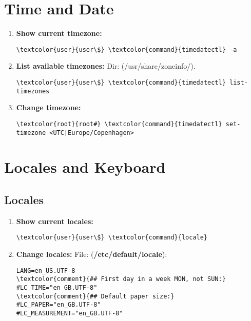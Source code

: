 \documentclass[10pt, a4paper, onecolumn, openany]{book} %
\begin{document}
\section{Time and Date}
\begin{enumerate}
    \item \textbf{Show current timezone:}
\begin{Verbatim}[commandchars=\\\{\}]
\textcolor{user}{user\$} \textcolor{command}{timedatectl} -a
\end{Verbatim}
    \item \textbf{List available timezones:}
    \newline Dir: (\textcolor{dir}{/usr/share/zoneinfo/}).
\begin{Verbatim}[commandchars=\\\{\}]
\textcolor{user}{user\$} \textcolor{command}{timedatectl} list-timezones
\end{Verbatim}
    \item \textbf{Change timezone:}
\begin{Verbatim}[commandchars=\\\{\}]
\textcolor{root}{root#} \textcolor{command}{timedatectl} set-timezone <UTC|Europe/Copenhagen>
\end{Verbatim}
\end{enumerate}
\section{Locales and Keyboard}
\subsection{Locales}
\begin{enumerate}
    \item \textbf{Show current locales:}
\begin{Verbatim}[commandchars=\\\{\}]
\textcolor{user}{user\$} \textcolor{command}{locale}
\end{Verbatim}
    \item \textbf{Change locales:}
\newline File: (\textbf{\textcolor{file}{/etc/default/locale}}):
\begin{Verbatim}[commandchars=\\\{\}]
LANG=en_US.UTF-8
\textcolor{comment}{## First day in a week MON, not SUN:}
#LC_TIME="en_GB.UTF-8"
\textcolor{comment}{## Default paper size:}
#LC_PAPER="en_GB.UTF-8"
#LC_MEASUREMENT="en_GB.UTF-8"
\end{Verbatim}
\end{enumerate}
\end{document}
